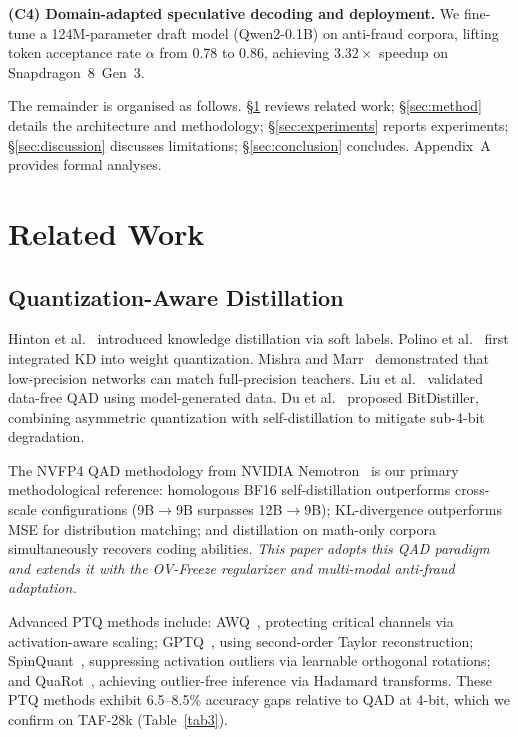 \documentclass[lettersize,journal]{IEEEtran}
\begin{document}
\textbf{(C4) Domain-adapted speculative decoding and deployment.}
We fine-tune a 124M-parameter draft model (Qwen2-0.1B) on anti-fraud
corpora, lifting token acceptance rate $\alpha$ from 0.78 to 0.86,
achieving $3.32\times$ speedup on Snapdragon~8~Gen~3.

The remainder is organised as follows. \S\ref{sec:related} reviews
related work; \S\ref{sec:method} details the architecture and
methodology; \S\ref{sec:experiments} reports experiments;
\S\ref{sec:discussion} discusses limitations; \S\ref{sec:conclusion}
concludes.  Appendix~A provides formal analyses.

\section{Related Work}
\label{sec:related}

\subsection{Quantization-Aware Distillation}

Hinton et al.~\cite{4} introduced knowledge distillation via soft
labels.  Polino et al.~\cite{5} first integrated KD into weight
quantization.  Mishra and Marr~\cite{6} demonstrated that
low-precision networks can match full-precision teachers.  Liu et
al.~\cite{7} validated data-free QAD using model-generated data.  Du
et al.~\cite{8} proposed BitDistiller, combining asymmetric
quantization with self-distillation to mitigate sub-4-bit degradation.

The NVFP4 QAD methodology from NVIDIA Nemotron~\cite{3} is our
primary methodological reference: homologous BF16 self-distillation
outperforms cross-scale configurations (9B$\rightarrow$9B surpasses
12B$\rightarrow$9B); KL-divergence outperforms MSE for distribution
matching; and distillation on math-only corpora simultaneously
recovers coding abilities.  \emph{This paper adopts this QAD
paradigm and extends it with the OV-Freeze regularizer and
multi-modal anti-fraud adaptation.}

Advanced PTQ methods include: AWQ~\cite{9}, protecting critical
channels via activation-aware scaling; GPTQ~\cite{10}, using
second-order Taylor reconstruction; SpinQuant~\cite{11}, suppressing
activation outliers via learnable orthogonal rotations; and
QuaRot~\cite{12}, achieving outlier-free inference via Hadamard
transforms.  These PTQ methods exhibit 6.5--8.5\% accuracy gaps
relative to QAD at 4-bit, which we confirm on TAF-28k
(Table~\ref{tab3}).
\end{document}

